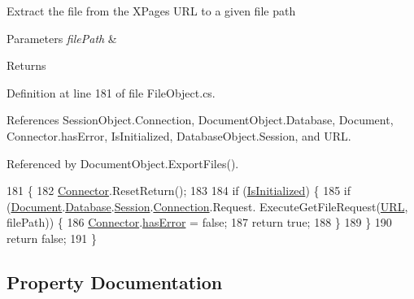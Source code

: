 Extract the file from the X\+Pages U\+RL to a given file path 


\begin{DoxyParams}{Parameters}
{\em file\+Path} & \\
\hline
\end{DoxyParams}
\begin{DoxyReturn}{Returns}

\end{DoxyReturn}


Definition at line 181 of file File\+Object.\+cs.



References Session\+Object.\+Connection, Document\+Object.\+Database, Document, Connector.\+has\+Error, Is\+Initialized, Database\+Object.\+Session, and U\+RL.



Referenced by Document\+Object.\+Export\+Files().


\begin{DoxyCode}
181                                              \{
182         \mbox{\hyperlink{class_connector}{Connector}}.ResetReturn();
183 
184         \textcolor{keywordflow}{if} (\mbox{\hyperlink{class_file_object_a36ff6c07d0662885402bfe7d98cf2988}{IsInitialized}}) \{
185             \textcolor{keywordflow}{if} (\mbox{\hyperlink{class_file_object_a0c9650a6ae1efb95f8211f9fa3b883fe}{Document}}.\mbox{\hyperlink{class_document_object_a69d5338c9835f748490323d2950eed09}{Database}}.\mbox{\hyperlink{class_database_object_aa8484162b7d2a7c4c9426bca13c64c07}{Session}}.\mbox{\hyperlink{class_session_object_a014bdbf705a753540e19bfb53030c55c}{Connection}}.Request.
      ExecuteGetFileRequest(\mbox{\hyperlink{class_file_object_a7355eaeea3fe40bd8862d7f1f9b479da}{URL}}, filePath)) \{
186                 \mbox{\hyperlink{class_connector}{Connector}}.\mbox{\hyperlink{class_connector_a079bae21a5417efa53bfe8954c0f533f}{hasError}} = \textcolor{keyword}{false};
187                 \textcolor{keywordflow}{return} \textcolor{keyword}{true};
188             \}
189         \}
190         \textcolor{keywordflow}{return} \textcolor{keyword}{false};
191     \}
\end{DoxyCode}


\subsection{Property Documentation}
\mbox{\label{class_file_object_a39640cdc4b16ee66e9c73803f4510396}} 
